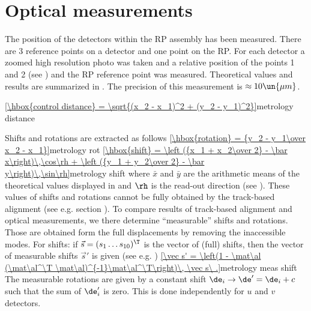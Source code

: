 \emfig

\emfig


\section{Optical measurements}

The position of the detectors within the RP assembly has been measured. There are 3 reference points on a detector and one point on the RP. For each detector a zoomed high resolution photo was taken and a relative position of the points 1 and 2 (see ) and the RP reference point was measured. Theoretical values and results are summarized in . The precision of this measurement is $\approx 10\un{\mu m}$.

\bmcent


\emcent

\eqref{\hbox{control distance} = \sqrt{(x_2 - x_1)^2 + (y_2 - y_1)^2}}{metrology distance}

Shifts and rotations are extracted as follows
\eqref{\hbox{rotation} = {y_2 - y_1\over x_2 - x_1}}{metrology rot}
\eqref{\hbox{shift} = \left ({x_1 + x_2\over 2} - \bar x\right)\,\cos\rh + \left ({y_1 + y_2\over 2} - \bar y\right)\,\sin\rh}{metrology shift}
where $\bar x$ and $\bar y$ are the arithmetic means of the theoretical values displayed in  and $\rh$ is the read-out direction (see ). These values of shifts and rotations cannot be fully obtained by the track-based alignment (see e.g. section ). To compare results of track-based alignment and optical measurements, we there determine ``measurable'' shifts and rotations. Those are obtained form the full displacements by removing the inaccessible modes. For shifts: if $\vec s = (s_1 \ldots s_{10})^\T$ is the vector of (full) shifts, then the vector of measurable shifts $\vec s'$ is given (see e.g. )
\eqref{\vec s' = \left(1 - \mat\al (\mat\al^\T \mat\al)^{-1}\mat\al^\T\right)\, \vec s\ .}{metrology meas shift}
The measurable rotations are given by a constant shift $\de_i \rightarrow \de' = \de_i + c$ such that the sum of $\de_i'$ is zero. This is done independently for $u$ and $v$ detectors.


